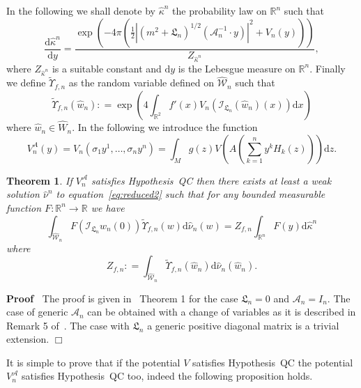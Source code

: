 \documentclass[a4paper,10pt]{article}
\newcommand{\mathd}{\mathrm{d}}
\newenvironment{proof}{\noindent\textbf{Proof\ }}{\hspace*{\fill}$\Box$\medskip}
\newtheorem{theorem}{Theorem}
\begin{document}
In the following we shall denote by $\hat{\kappa}^n$ the probability law on
$\mathbb{R}^n$ such that
\[ \frac{\mathd \hat{\kappa}^n}{\mathd y} = \frac{\exp \left( - 4 \pi \left(
   \frac{1}{2} | (m^2 +\mathfrak{L}_n)^{1 / 2} (\mathcal{A}_n^{- 1} \cdot
   y) |^2 + V_n (y) \right) \right)}{Z_{\hat{\kappa}^n}}, \]
where $Z_{\hat{\kappa}^n}$ is a suitable constant and $\mathd y$ is the
Lebesgue measure on $\mathbb{R}^n$. Finally we define $\tilde{\Upsilon}_{f,
n}$ as the random variable defined on $\widehat{\mathcal{W}}_n$ such that
\[ \tilde{\Upsilon}_{f, n} (\hat{w}_n) : = \exp \left( 4 \int_{\mathbb{R}^2}
   f' (x) V_n (\mathcal{I}_{\mathfrak{L}_n} (\hat{w}_n) (x)) \mathd x \right)
\]
where $\hat{w}_n \in \widehat{W}_n$. In the following we introduce the
function
\[ V^A_n (y) = V_n (\sigma_1 y^1, \ldots, \sigma_n y^n) = \int_M g (z) V
   \left( A \left( \sum_{k = 1}^n y^k H_k (z) \right) \right) \mathd z. \]
\begin{theorem}
  \label{theorem:reduced1}If $V^{\mathcal{A}}_n$ satisfies Hypothesis~QC then
  there exists at least a weak solution $\hat{\nu}^n$ to
  equation~{\eqref{eq:reduced2}} such that for any bounded measurable function
  $F : \mathbb{R}^n \rightarrow \mathbb{R}$ we have
  \begin{equation}
    \int_{\widehat{\mathcal{W}}_n} F ( \mathcal{I}_{\mathfrak{L}_n}
    \hat{w}_n (0)) \tilde{\Upsilon}_{f, n} (w) \mathd \hat{\nu}_n (w) = Z_{f,
    n} \int_{\mathbb{R}^n} F (y) \mathd \hat{\kappa}^n \label{eq:reduced4}
  \end{equation}
  where
  \begin{equation}
    Z_{f, n} : = \int_{\widehat{\mathcal{W}}_n} \tilde{\Upsilon}_{f, n}
    (\hat{w}_n) \mathd \hat{\nu}_n (\hat{w}_n) . \label{eq:Zf}
  \end{equation}
\end{theorem}

\begin{proof}
  The proof is given in~{\cite{Albeverio2018elliptic}} Theorem 1 for the case
  $\mathfrak{L}_n = 0$ and ${\mathcal{A}}_n = I_n$. The case of generic ${\mathcal{A}}_n$ can be
  obtained with a change of variables as it is described in Remark 5
  of~{\cite{Albeverio2018elliptic}}. The case with $\mathfrak{L}_n$ a generic
  positive diagonal matrix is a trivial extension.
\end{proof}

It is simple to prove that if the potential $V$ satisfies Hypothesis~QC the
potential $V_n^{\mathcal{A}}$ satisfies Hypothesis~QC too, indeed the
following proposition holds.
\end{document}
